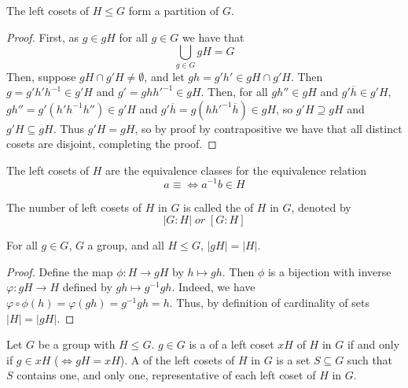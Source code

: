 \documentclass[12pt, a4paper, oneside, openright, titlepage]{book}
\begin{document}
\begin{lem}
        The left cosets of $H \leq G$ form a partition of $G$.
\end{lem}
\begin{proof}
        First, as $g \in gH$ for all $g \in G$ we have that $$\bigcup\limits_{g\in G}gH = G$$
        Then, suppose $gH\cap g'H \neq \emptyset$, and let $gh = g'h' \in gH\cap g'H$. Then $g = g'h'h^{-1} \in g'H$ and $g' = gh{h'}^{-1} \in gH$. Then, for all $gh'' \in gH$ and $g'\overline{h} \in g'H$, $gh'' = g'(h'h^{-1}h'') \in g'H$ and $g'\overline{h} = g(h{h'}^{-1}\overline{h}) \in gH$, so $g'H \supseteq gH$ and $g'H \subseteq gH$. Thus $g'H = gH$, so by proof by contrapositive we have that all distinct cosets are disjoint, completing the proof.
\end{proof}

\begin{rmk}
        The left cosets of $H$ are the equivalence classes for the equivalence relation \begin{equation}
                a \equiv \iff a^{-1}b \in H
        \end{equation}
\end{rmk}

\begin{defn}[Index]
        The number of left cosets of $H$ in $G$ is called the  of $H$ in $G$, denoted by \begin{equation}
                |G:H|\;or\;[G:H]
        \end{equation}
\end{defn}


\begin{lem}
        For all $g \in G$, $G$ a group, and all $H \leq G$, $|gH| = |H|$.
\end{lem}
\begin{proof}
        Define the map $\phi:H\rightarrow gH$ by $h \mapsto gh$. Then $\phi$ is a bijection with inverse $\varphi:gH\rightarrow H$ defined by $gh \mapsto g^{-1}gh$. Indeed, we have $\varphi \circ \phi(h) = \varphi(gh) = g^{-1}gh = h$. Thus, by definition of cardinality of sets $|H| = |gH|$.
\end{proof}



\begin{defn}
        Let $G$ be a group with $H \leq G$. $g \in G$ is a  of a left coset $xH$ of $H$ in $G$ if and only if $g \in xH$ ($\iff gH = xH$). A  of the left cosets of $H$ in $G$ is a set $S \subseteq G$ such that $S$ contains one, and only one, representative of each left coset of $H$ in $G$.
\end{defn}
\end{document}
